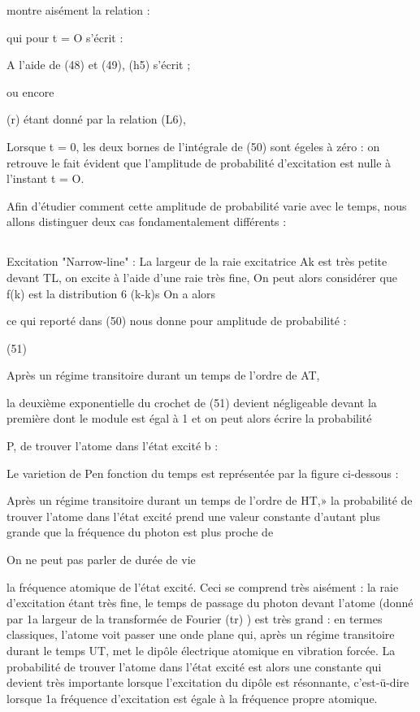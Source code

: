 montre aisément la relation :

qui pour t = O s'écrit :

A l'aide de (48) et (49), (h5) s'écrit ;

ou encore

(r) étant donné par la relation (L6),


Lorsque t = 0, les deux bornes de l'intégrale de (50) sont
égeles à zéro : on retrouve le fait évident que l'amplitude de probabilité
d'excitation est nulle à l'instant t = O.

Afin d'étudier comment cette amplitude de probabilité varie
avec le temps, nous allons distinguer deux cas fondamentalement différents :
\subsection{} Excitation "Narrow-line" :%
La largeur de la raie excitatrice Ak est très
petite devant TL,  on excite à l'aide d'une raie très fine, On peut alors
considérer que f(k) est la distribution 6 (k-k)s On a alors

ce qui reporté dans (50) nous donne pour amplitude de probabilité :

(51)

Après un régime transitoire durant un temps de l'ordre de AT,

la deuxième exponentielle du crochet de (51) devient négligeable devant la
première dont le module est égal à 1 et on peut alors écrire la probabilité

P, de trouver l'atome dans l'état excité b :

Le varietion de Pen fonction du temps est représentée par la figure ci-dessous :

Après un régime transitoire durant un temps de l'ordre de
HT,» la probabilité de trouver l'atome dans l'état excité prend une valeur
constante d'autant plus grande que la fréquence du photon est plus proche de

 On ne peut pas parler de durée de vie



la fréquence atomique
de l'état excité.
Ceci se comprend très aisément : la raie d'excitation étant
très fine, le temps de passage du photon devant l'atome (donné par 1a largeur
de la transformée de Fourier  (tr) ) est très grand : en termes classiques,
l'atome voit passer une onde plane qui, après un régime transitoire durant le
temps UT, met le dipôle électrique atomique en vibration forcée. La probabilité de trouver l'atome dans l'état excité est alors une constante qui devient
très importante lorsque l'excitation du dipôle est résonnante, c'est-ü-dire
lorsque 1a fréquence d'excitation est égale à la fréquence propre atomique.
